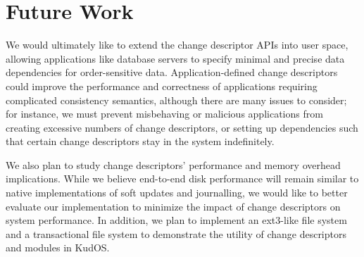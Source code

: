 
\preparagraphspacing{}
\section*{Future Work}
\label{sec:future}

We would ultimately like to extend the change descriptor APIs into
user space, allowing applications like database servers to
specify minimal and precise data dependencies for order-sensitive data.
Application-defined
change descriptors could improve the performance and correctness
of applications requiring complicated consistency semantics, although
there are many issues to consider;
for instance, we must prevent misbehaving
or malicious applications from creating excessive numbers of change
descriptors, or setting up dependencies such that certain change
descriptors stay in the system indefinitely.

We also plan to study change descriptors' performance and memory overhead
implications.
While we believe end-to-end disk performance will
remain similar to native implementations of soft updates and journalling,
we
would like to better evaluate our implementation to minimize the impact
of change descriptors on system performance. %
In addition, we plan to implement an ext3-like file system and a
transactional file system to demonstrate the utility of change
descriptors and modules in KudOS.
